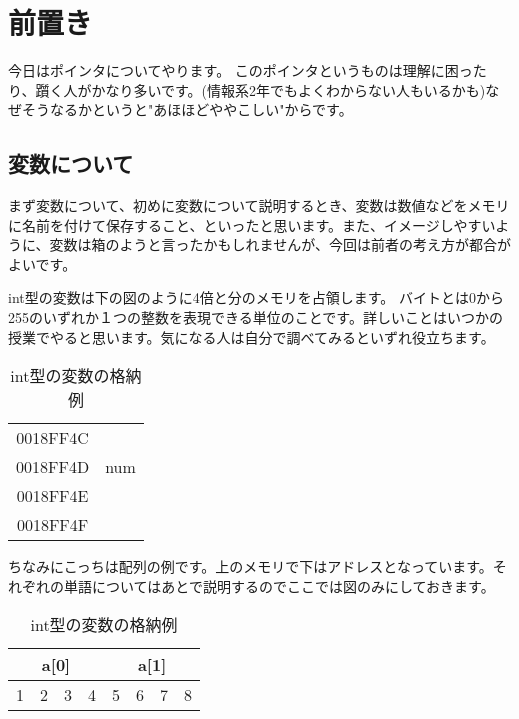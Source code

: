 ﻿\section{前置き}
今日はポインタについてやります。
このポインタというものは理解に困ったり、躓く人がかなり多いです。(情報系2年でもよくわからない人もいるかも)なぜそうなるかというと"あほほどややこしい"からです。

\subsection{変数について}
まず変数について、初めに変数について説明するとき、変数は数値などをメモリに名前を付けて保存すること、といったと思います。また、イメージしやすいように、変数は箱のようと言ったかもしれませんが、今回は前者の考え方が都合がよいです。

int型の変数は下の図のように4倍と分のメモリを占領します。
バイトとは0から255のいずれか１つの整数を表現できる単位のことです。詳しいことはいつかの授業でやると思います。気になる人は自分で調べてみるといずれ役立ちます。

\begin{table}[htb]
\begin{center}
\begin{tabular}{|c|c|}
\hline
0018FF4C & \\ \cline{1-1}
0018FF4D & num \\ \cline{1-1}
0018FF4E & \\ \cline{1-1}
0018FF4F & \\ \cline{1-1}
\hline

\end{tabular}
\caption{ int型の変数の格納例}
\end{center}
\end{table}

ちなみにこっちは配列の例です。上のメモリで下はアドレスとなっています。それぞれの単語についてはあとで説明するのでここでは図のみにしておきます。


\begin{table}[htb]
\begin{center}
\begin{tabular}{|c|c|c|c|c|c|c|c|}\hline

\multicolumn{4}{|c|}{a[0]}& \multicolumn{4}{|c|}{a[1]}\\ \hline
1&2&3&4&5&6&7&8\\ \hline

\end{tabular}
\caption{ int型の変数の格納例}
\end{center}
\end{table}